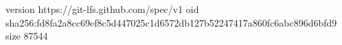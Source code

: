version https://git-lfs.github.com/spec/v1
oid sha256:fd8fa2a8cc69ef8c5d447025c1d6572db127b52247417a860fc6abc896d6bfd9
size 87544

